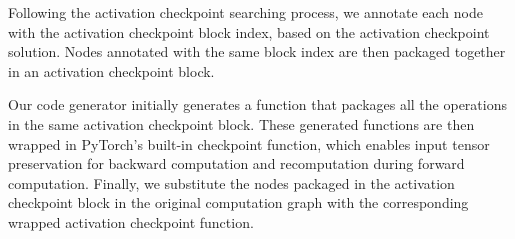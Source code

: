 Following the activation checkpoint searching process, we annotate each node with the activation checkpoint block index, based on the activation checkpoint solution. Nodes annotated with the same block index are then packaged together in an activation checkpoint block.

Our code generator initially generates a function that packages all the operations in the same activation checkpoint block. These generated functions are then wrapped in PyTorch's built-in checkpoint function, which enables input tensor preservation for backward computation and recomputation during forward computation. Finally, we substitute the nodes packaged in the activation checkpoint block in the original computation graph with the corresponding wrapped activation checkpoint function.